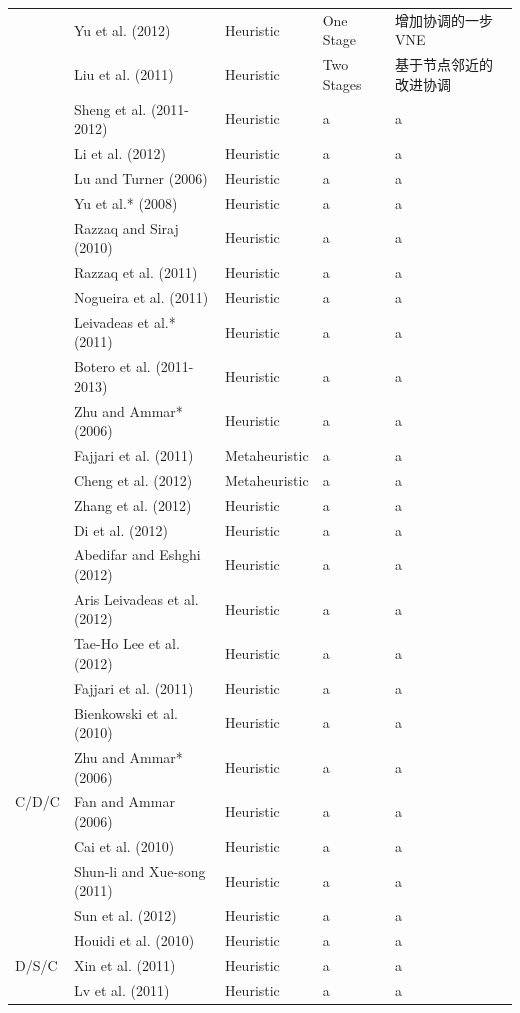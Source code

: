 \begin{longtable}{lllll}
 & Yu et al. (2012)\cite{yu2012cost}  & Heuristic & One Stage & 增加协调的一步VNE\\
 & Liu et al. (2011)  & Heuristic & Two Stages & 基于节点邻近的改进协调\\
 & Sheng et al. (2011-2012)  & Heuristic & a & a\\
 & Li et al. (2012)  & Heuristic & a & a\\
 & Lu and Turner (2006)  & Heuristic & a & a\\
 & Yu et al.* (2008)  & Heuristic & a & a\\
 & Razzaq and Siraj (2010)  & Heuristic & a & a\\
 & Razzaq et al. (2011)  & Heuristic & a & a\\
 & Nogueira et al. (2011)  & Heuristic & a & a\\
 & Leivadeas et al.* (2011)  & Heuristic & a & a\\
 & Botero et al. (2011-2013)  & Heuristic & a & a\\
 & Zhu and Ammar* (2006)  & Heuristic & a & a\\
 & Fajjari et al. (2011)  & Metaheuristic & a & a\\
 & Cheng et al. (2012)  & Metaheuristic & a & a\\
 & Zhang et al. (2012)  & Heuristic & a & a\\
 & Di et al. (2012)  & Heuristic & a & a\\
 & Abedifar and Eshghi (2012)  & Heuristic & a & a\\
 & Aris Leivadeas et al. (2012)  & Heuristic & a & a\\
 & Tae-Ho Lee et al. (2012)  & Heuristic & a & a\\
\hline
\multirow{7}{*}{C/D/C} & Fajjari et al. (2011)  & Heuristic & a& a\\
 & Bienkowski et al. (2010)  & Heuristic & a & a\\
 & Zhu and Ammar* (2006)  & Heuristic & a & a\\
 & Fan and Ammar (2006)  & Heuristic & a & a\\
 & Cai et al. (2010)  & Heuristic & a & a\\
 & Shun-li and Xue-song (2011)  & Heuristic & a & a\\
 & Sun et al. (2012)  & Heuristic & a & a\\
\hline
\multirow{5}{*}{D/S/C} & Houidi et al. (2010)  & Heuristic & a& a\\
 & Xin et al. (2011)  & Heuristic & a & a\\
 & Lv et al. (2011)  & Heuristic & a & a\\

\end{longtable}
